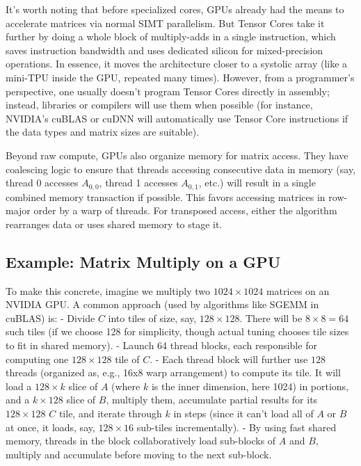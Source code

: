 It’s worth noting that before specialized cores, GPUs already had the means to accelerate matrices via normal SIMT parallelism. But Tensor Cores take it further by doing a whole block of multiply-adds in a single instruction, which saves instruction bandwidth and uses dedicated silicon for mixed-precision operations. In essence, it moves the architecture closer to a systolic array (like a mini-TPU inside the GPU, repeated many times). However, from a programmer’s perspective, one usually doesn’t program Tensor Cores directly in assembly; instead, libraries or compilers will use them when possible (for instance, NVIDIA’s cuBLAS or cuDNN will automatically use Tensor Core instructions if the data types and matrix sizes are suitable).

Beyond raw compute, GPUs also organize memory for matrix access. They have coalescing logic to ensure that threads accessing consecutive data in memory (say, thread 0 accesses $A_{0,0}$, thread 1 accesses $A_{0,1}$, etc.) will result in a single combined memory transaction if possible. This favors accessing matrices in row-major order by a warp of threads. For transposed access, either the algorithm rearranges data or uses shared memory to stage it.

\subsection{Example: Matrix Multiply on a GPU}  
To make this concrete, imagine we multiply two $1024 \times 1024$ matrices on an NVIDIA GPU. A common approach (used by algorithms like SGEMM in cuBLAS) is:
- Divide $C$ into tiles of size, say, $128 \times 128$. There will be $8 \times 8 = 64$ such tiles (if we choose 128 for simplicity, though actual tuning chooses tile sizes to fit in shared memory).
- Launch 64 thread blocks, each responsible for computing one $128 \times 128$ tile of $C$.
- Each thread block will further use $128$ threads (organized as, e.g., 16x8 warp arrangement) to compute its tile. It will load a $128 \times k$ slice of $A$ (where $k$ is the inner dimension, here 1024) in portions, and a $k \times 128$ slice of $B$, multiply them, accumulate partial results for its $128\times128$ $C$ tile, and iterate through $k$ in steps (since it can’t load all of $A$ or $B$ at once, it loads, say, $128 \times 16$ sub-tiles incrementally).
- By using fast shared memory, threads in the block collaboratively load sub-blocks of $A$ and $B$, multiply and accumulate before moving to the next sub-block.

